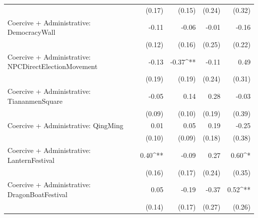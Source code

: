 \begin{table}
\begin{center}
\begin{tabular}{l D{.}{.}{6.5} D{.}{.}{6.5} D{.}{.}{6.5} D{.}{.}{6.5}}
                                                     & (0.17)                  & (0.15)                  & (0.24)                  & (0.32)                  \\
Coercive + Administrative: DemocracyWall             & -0.11                   & -0.06                   & -0.01                   & -0.16                   \\
                                                     & (0.12)                  & (0.16)                  & (0.25)                  & (0.22)                  \\
Coercive + Administrative: NPCDirectElectionMovement & -0.13                   & -0.37^{**}              & -0.11                   & 0.49                    \\
                                                     & (0.19)                  & (0.19)                  & (0.24)                  & (0.31)                  \\
Coercive + Administrative: TiananmenSquare           & -0.05                   & 0.14                    & 0.28                    & -0.03                   \\
                                                     & (0.09)                  & (0.10)                  & (0.19)                  & (0.39)                  \\
Coercive + Administrative: QingMing                  & 0.01                    & 0.05                    & 0.19                    & -0.25                   \\
                                                     & (0.10)                  & (0.09)                  & (0.18)                  & (0.38)                  \\
Coercive + Administrative: LanternFestival           & 0.40^{**}               & -0.09                   & 0.27                    & 0.60^{*}                \\
                                                     & (0.16)                  & (0.17)                  & (0.24)                  & (0.35)                  \\
Coercive + Administrative: DragonBoatFestival        & 0.05                    & -0.19                   & -0.37                   & 0.52^{**}               \\
                                                     & (0.14)                  & (0.17)                  & (0.27)                  & (0.26)                  \\

\end{tabular}
\end{center}
\end{table}
